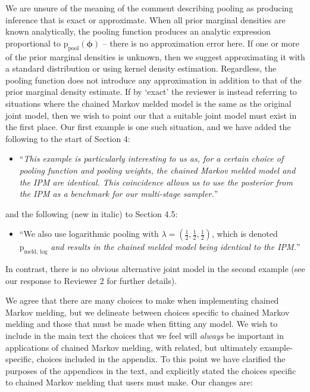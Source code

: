 \documentclass[
  10pt,
  a4paper,
]{article}
\providecommand{\tightlist}{%
  \setlength{\itemsep}{0pt}\setlength{\parskip}{0pt}}
\newcommand{\pd}{\text{p}}
\begin{document}
We are unsure of the meaning of the comment describing pooling as
producing inference that is exact or approximate. When all prior
marginal densities are known analytically, the pooling function produces
an analytic expression proportional to
\(\pd_{\text{pool}}(\boldsymbol{\phi})\) -- there is no approximation
error here. If one or more of the prior marginal densities is unknown,
then we suggest approximating it with a standard distribution or using
kernel density estimation. Regardless, the pooling function does not
introduce any approximation in addition to that of the prior marginal
density estimate. If by `exact' the reviewer is instead referring to
situations where the chained Markov melded model is the same as the
original joint model, then we wish to point our that a suitable joint
model must exist in the first place. Our first example is one such
situation, and we have added the following to the start of Section 4:

\begin{itemize}
\tightlist
\item
  ``\emph{This example is particularly interesting to us as, for a
  certain choice of pooling function and pooling weights, the chained
  Markov melded model and the IPM are identical. This coincidence allows
  us to use the posterior from the IPM as a benchmark for our
  multi-stage sampler.}''
\end{itemize}

and the following (new in italic) to Section 4.5:

\begin{itemize}
\tightlist
\item
  ``We also use logarithmic pooling with
  \(\lambda = (\frac{1}{2}, \frac{1}{2}, \frac{1}{2})\), which is
  denoted \(\pd_{\text{meld, log}}\) \emph{and results in the chained
  melded model being identical to the IPM.}''
\end{itemize}

In contrast, there is no obvious alternative joint model in the second
example (see our response to Reviewer 2 for further details).

We agree that there are many choices to make when implementing chained
Markov melding, but we delineate between choices specific to chained
Markov melding and those that must be made when fitting any model. We
wish to include in the main text the choices that we feel will
\emph{always} be important in applications of chained Markov melding,
with related, but ultimately example-specific, choices included in the
appendix. To this point we have clarified the purposes of the appendices
in the text, and explicitly stated the choices specific to chained
Markov melding that users must make. Our changes are:
\end{document}
